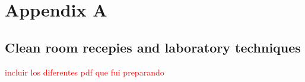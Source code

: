 \chapter{Appendix A}
\label{appendixa}

\section{Clean room recepies and laboratory techniques}

\textcolor{red}{incluir los diferentes pdf que fui preparando}
